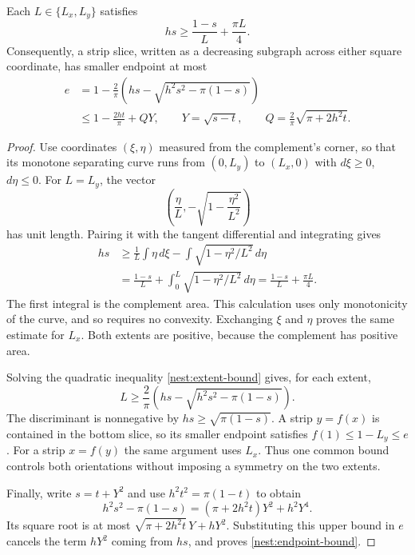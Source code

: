 

\begin{lemma}
\label{nest:bottom-calibration}
Each $L\in\{L_x,L_y\}$ satisfies
\begin{equation}\label{nest:extent-bound}
 hs\geq\frac{1-s}{L}+\frac{\pi L}{4}.
\end{equation}
Consequently, a strip slice, written as a decreasing subgraph across
either square coordinate, has smaller endpoint at most
\begin{equation}\label{nest:endpoint-bound}
 \begin{split}
 e&=1-\frac2\pi
       \left(hs-\sqrt{h^2s^2-\pi(1-s)}\right)\\
  &\leq1-\frac{2ht}{\pi}+QY,
 \qquad
 Y=\sqrt{s-t},\qquad
 Q=\frac2\pi\sqrt{\pi+2h^2t}.
 \end{split}
\end{equation}
\end{lemma}

\begin{proof}
Use coordinates $(\xi,\eta)$ measured from the complement's corner,
so that its monotone separating curve runs from $(0,L_y)$ to
$(L_x,0)$ with $d\xi\geq0$, $d\eta\leq0$.
For $L=L_y$, the vector
\[
 \left(\frac\eta L,-\sqrt{1-\frac{\eta^2}{L^2}}\right)
\]
has unit length.  Pairing it with the tangent differential and
integrating gives
\[
 \begin{split}
 hs&\geq
 \frac1L\int\eta\,d\xi
   -\int\sqrt{1-\eta^2/L^2}\,d\eta\\
 &=\frac{1-s}{L}+\int_0^L\sqrt{1-\eta^2/L^2}\,d\eta
 =\frac{1-s}{L}+\frac{\pi L}4.
 \end{split}
\]
The first integral is the complement area.  This calculation uses
only monotonicity of the curve, and so requires no convexity.
Exchanging $\xi$ and $\eta$ proves the same estimate for $L_x$.
Both extents are positive, because the complement has positive area.

Solving the quadratic inequality \eqref{nest:extent-bound} gives,
for each extent,
\[
 L\geq\frac2\pi
    \left(hs-\sqrt{h^2s^2-\pi(1-s)}\right).
\]
The discriminant is nonnegative by $hs\geq\sqrt{\pi(1-s)}$.
A strip $y=f(x)$ is contained in the bottom slice, so its smaller
endpoint satisfies $f(1)\leq1-L_y\leq e$.  For a strip $x=f(y)$
the same argument uses $L_x$.  Thus one common bound controls both
orientations without imposing a symmetry on the two extents.

Finally, write $s=t+Y^2$ and use $h^2t^2=\pi(1-t)$ to obtain
\[
 h^2s^2-\pi(1-s)
   =(\pi+2h^2t)Y^2+h^2Y^4.
\]
Its square root is at most
$\sqrt{\pi+2h^2t}\,Y+hY^2$.  Substituting this upper bound in
$e$ cancels the term $hY^2$ coming from $hs$, and proves
\eqref{nest:endpoint-bound}.
\end{proof}

